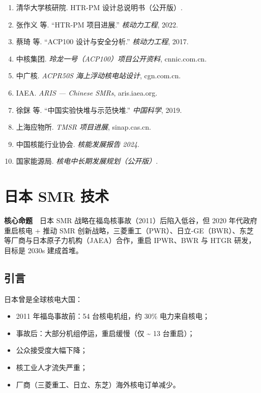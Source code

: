 \documentclass[
  UTF8,
  scheme=plain,
  fontsize=10pt,
  openany
]{ctexbook}
\begin{document}
\begin{enumerate}
\def\labelenumi{\arabic{enumi}.}
\tightlist
\item
  清华大学核研院. HTR-PM 设计总说明书（公开版）.
\item
  张作义 等. ``HTR-PM 项目进展.'' \emph{核动力工程}, 2022.
\item
  蔡琦 等. ``ACP100 设计与安全分析.'' \emph{核动力工程}, 2017.
\item
  中核集团. \emph{玲龙一号（ACP100）项目公开资料}, cnnic.com.cn.
\item
  中广核. \emph{ACPR50S 海上浮动核电站设计}, cgn.com.cn.
\item
  IAEA. \emph{ARIS --- Chinese SMRs}, aris.iaea.org.
\item
  徐銤 等. ``中国实验快堆与示范快堆.'' \emph{中国科学}, 2019.
\item
  上海应物所. \emph{TMSR 项目进展}, sinap.cas.cn.
\item
  中国核能行业协会. \emph{核能发展报告 2024}.
\item
  国家能源局. \emph{核电中长期发展规划（公开版）}.
\end{enumerate}

\cleardoublepage

\chapter{日本 SMR 技术}\label{ux65e5ux672c-smr-ux6280ux672f}

\begin{epigraph}

\textbf{核心命题}　日本 SMR 战略在福岛核事故（2011）后陷入低谷，但 2020
年代政府重启核电 + 推动 SMR
创新战略，三菱重工（PWR）、日立-GE（BWR）、东芝等厂商与日本原子力机构（JAEA）合作，重启
IPWR、BWR 与 HTGR 研发，目标是 2030s 建成首堆。

\end{epigraph}

\section{引言}\label{ux5f15ux8a00-18}

日本曾是全球核电大国：

\begin{itemize}
\tightlist
\item
  2011 年福岛事故前：54 台核电机组，约 30\% 电力来自核电；
\item
  事故后：大部分机组停运，重启缓慢（仅 \textasciitilde{} 13 台重启）；
\item
  公众接受度大幅下降；
\item
  核工业人才流失严重；
\item
  厂商（三菱重工、日立、东芝）海外核电订单减少。
\end{itemize}
\end{document}

